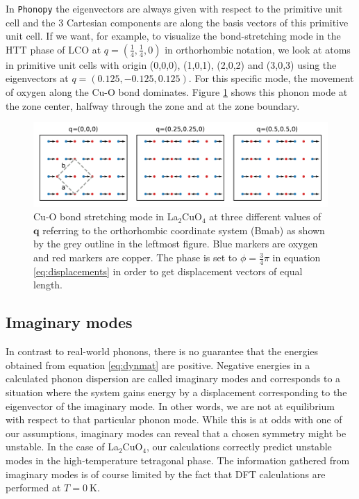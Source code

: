 In \texttt{Phonopy} the eigenvectors are always given with respect to the primitive unit cell and the 3 Cartesian components are along the basis vectors of this primitive unit cell. If we want, for example, to visualize the bond-stretching mode in the HTT phase of LCO at $q=(\frac{1}{4},\frac{1}{4},0)$ in orthorhombic notation, we look at atoms in primitive unit cells with origin (0,0,0), (1,0,1), (2,0,2) and (3,0,3) using the eigenvectors at $q=(0.125,-0.125,0.125)$. For this specific mode, the movement of oxygen along the Cu-O bond dominates. Figure \ref{fig:bs-displacements} shows this phonon mode at the zone center, halfway through the zone and at the zone boundary. 

\begin{figure}
	\centering
	\includegraphics[width=\textwidth]{fig/method/dft/bs-phonons.pdf}
	\caption[bond-stretching phonons visualized]{Cu-O bond stretching mode in La$_2$CuO$_4$ at three different values of $\bm{q}$ referring to the orthorhombic coordinate system (Bmab) as shown by the grey outline in the leftmost figure. Blue markers are oxygen and red markers are copper. The phase is set to $\phi=\frac{3}{4}\pi$ in equation \ref{eq:displacements} in order to get displacement vectors of equal length.}
	\label{fig:bs-displacements}
\end{figure}

\subsection{Imaginary modes}
In contrast to real-world phonons, there is no guarantee that the energies obtained from equation \eqref{eq:dynmat} are positive. Negative energies in a calculated phonon dispersion are called imaginary modes and corresponds to a situation where the system gains energy by a displacement corresponding to the eigenvector of the imaginary mode. In other words, we are not at equilibrium with respect to that particular phonon mode. While this is at odds with one of our assumptions, imaginary modes can reveal that a chosen symmetry might be unstable. In the case of La$_2$CuO$_4$, our calculations correctly predict unstable modes in the high-temperature tetragonal phase. The information gathered from imaginary modes is of course limited by the fact that DFT calculations are performed at $T=\SI{0}{\kelvin}$.


